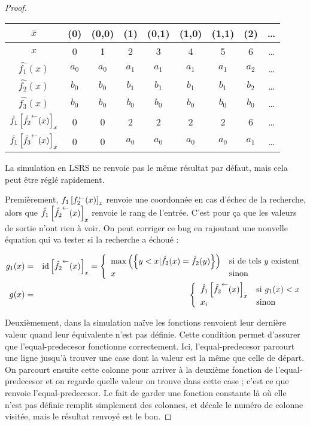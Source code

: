 \begin{proof}
		\espace 
		
		\begin{center}
			\begin{tabular}{|c|cccccccc|}
				\hline
				$\bar{x}$			& (0)	& (0,0)	& (1)	& (0,1)	& (1,0)	& (1,1)	& (2)	& \dots \\
				\hline
				$x$					& 0 	& 1	 	& 2		& 3 	& 4 	& 5 	& 6 	& \dots \\
				\hline 
				$\hat{f_1}(x)$
									& $a_0$	& $a_0$	& $a_1$	& $a_1$	& $a_1$	& $a_1$	& $a_2$	& \dots \\
				$\hat{f_2}(x)$ 		
									& $b_0$	& $b_0$	& $b_1$	& $b_1$	& $b_1$	& $b_1$	& $b_2$	& \dots \\
				$\hat{f_3}(x)$ 		
									& $b_0$	& $b_0$	& $b_0$	& $b_0$	& $b_0$	& $b_0$	& $b_0$	& \dots \\
				$\hat{f_1}\left[ \hat{f_2}^{\leftarrow}(x) \right]_{x}$
									& 0		& 0		& 2		& 2		& 2		& 2		& 6		& \dots \\
				$\hat{f_1}\left[ \hat{f_3}^{\leftarrow}(x) \right]_{x}$
									& 0		& 0		& $a_0$ & $a_0$	& $a_0$	& $a_0$	& $a_1$	& \dots \\
				\hline
			\end{tabular}
		\end{center}
				
		La simulation en LSRS ne renvoie pas le même résultat par défaut, mais cela peut être réglé rapidement.
				
		Premièrement, $f_1\left[ f_2^{\leftarrow}(x) \right]_{x}$ renvoie une coordonnée en cas d'échec de la recherche, alors que $\hat{f_1}\left[ \hat{f_2}^{\leftarrow}(x) \right]_{x}$ renvoie le rang de l'entrée. C'est pour ça que les valeurs de sortie n'ont rien à voir. On peut corriger ce bug en rajoutant une nouvelle équation qui va tester si la recherche a échoué :
		
		\begin{eqnarray}
		g_1(x) 	& = 	& \text{id}\left[ \hat{f_2}^{\leftarrow}(x) \right]_{x} = \left\lbrace \begin{array}{ll} 
			\max\left( \left\lbrace y<x | \hat{f_2}(x) = \hat{f_2}(y) \right\rbrace \right) & \text{si de tels $y$ existent}\\
			x		& \text{sinon}
		 \end{array} \right. \\
		g(x) & = & \left\lbrace \begin{array}{ll} 
			\hat{f_1}\left[ \hat{f_2}^{\leftarrow}(x) \right]_{x} & \text{si $g_1(x) < x$}\\
			x_i		& \text{sinon}
		 \end{array} \right.
		\end{eqnarray}
		
		Deuxièmement, dans la simulation naïve les fonctions renvoient leur dernière valeur quand leur équivalente n'est pas définie. Cette condition permet d'assurer que l'equal-predecesor fonctionne correctement. Ici, l'equal-predecesor parcourt une ligne jusqu'à trouver une case dont la valeur est la même que celle de départ. On parcourt ensuite cette colonne pour arriver à la deuxième fonction de l'equal-predecesor et on regarde quelle valeur on trouve dans cette case ; c'est ce que renvoie l'equal-predecesor. Le fait de garder une fonction constante là où elle n'est pas définie remplit simplement des colonnes, et décale le numéro de colonne visitée, mais le résultat renvoyé est le bon. 
		

\end{proof}
